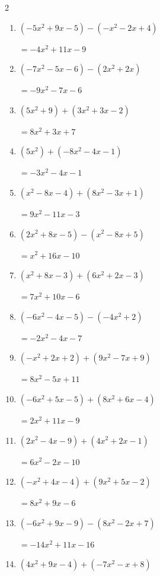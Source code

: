 \begin{multicols}{2}
\begin{enumerate}
        $=6x^{2}-3x-12$

  \item $(-5x^{2}+9x-5)-(-x^{2}-2x+4)$

        $=-4x^{2}+11x-9$

  \item $(-7x^{2}-5x-6)-(2x^{2}+2x)$

        $=-9x^{2}-7x-6$

  \item $(5x^{2}+9)+(3x^{2}+3x-2)$

        $=8x^{2}+3x+7$

  \item $(5x^{2})+(-8x^{2}-4x-1)$

        $=-3x^{2}-4x-1$

  \item $(x^{2}-8x-4)+(8x^{2}-3x+1)$

        $=9x^{2}-11x-3$

  \item $(2x^{2}+8x-5)-(x^{2}-8x+5)$

        $=x^{2}+16x-10$

  \item $(x^{2}+8x-3)+(6x^{2}+2x-3)$

        $=7x^{2}+10x-6$

  \item $(-6x^{2}-4x-5)-(-4x^{2}+2)$

        $=-2x^{2}-4x-7$

  \item $(-x^{2}+2x+2)+(9x^{2}-7x+9)$

        $=8x^{2}-5x+11$

\columnbreak %

  \item $(-6x^{2}+5x-5)+(8x^{2}+6x-4)$

        $=2x^{2}+11x-9$

  \item $(2x^{2}-4x-9)+(4x^{2}+2x-1)$

        $=6x^{2}-2x-10$

  \item $(-x^{2}+4x-4)+(9x^{2}+5x-2)$

        $=8x^{2}+9x-6$

  \item $(-6x^{2}+9x-9)-(8x^{2}-2x+7)$

        $=-14x^{2}+11x-16$

  \item $(4x^{2}+9x-4)+(-7x^{2}-x+8)$


\end{enumerate}
\end{multicols}
